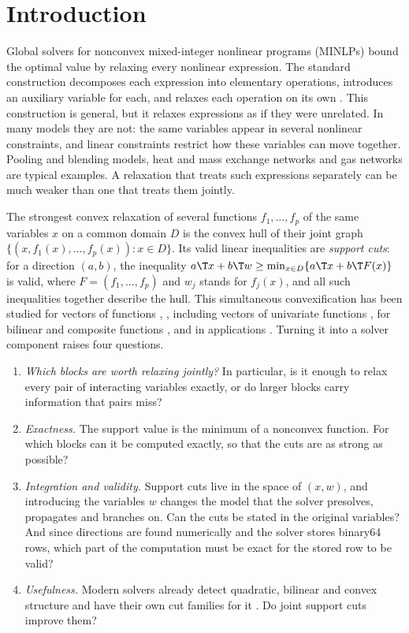 \section{Introduction}\label{sec:introduction}

Global solvers for nonconvex mixed-integer nonlinear programs (MINLPs) bound
the optimal value by relaxing every nonlinear expression. The standard
construction decomposes each expression into elementary operations,
introduces an auxiliary variable for each, and relaxes each operation on its
own \citep{McCormick1976,SmithPantelides1999,TawarmalaniSahinidis2004}. This
construction is general, but it relaxes expressions as if they were
unrelated. In many models they are not: the same variables appear in several
nonlinear constraints, and linear constraints restrict how these variables
can move together. Pooling and blending models, heat and mass exchange
networks and gas networks are typical examples. A relaxation that treats such
expressions separately can be much weaker than one that treats them jointly.

The strongest convex relaxation of several functions $f_1,\dots,f_p$ of the
same variables $x$ on a common domain $D$ is the convex hull of their joint
graph $\{(x,f_1(x),\dots,f_p(x)):x\in D\}$. Its valid linear inequalities are
\emph{support cuts}: for a direction $(a,b)$, the inequality
$a\T x+b\T w\ge\min_{x\in D}\{a\T x+b\T F(x)\}$ is valid, where
$F=(f_1,\dots,f_p)$ and $w_j$ stands for $f_j(x)$, and all such inequalities together describe the hull. This
simultaneous convexification has been studied for vectors of functions
\citep{Tawarmalani2010}, \citep[Proposition~1]{LiersEtAl2021}, including
vectors of univariate functions \citep{HeLiuTawarmalani2025}, for bilinear and
composite functions
\citep{DavarniaRichardTawarmalani2017,HeTawarmalani2021,ZhuHeTawarmalani2026},
and in applications \citep{LiersEtAl2021}.
Turning it into a solver component raises four questions.
\begin{enumerate}[label=(\arabic*)]
\item \emph{Which blocks are worth relaxing jointly?} In particular, is it
enough to relax every pair of interacting variables exactly, or do larger
blocks carry information that pairs miss?
\item \emph{Exactness.} The support value is the minimum of a nonconvex
function. For which blocks can it be computed exactly, so that the cuts are
as strong as possible?
\item \emph{Integration and validity.} Support cuts live in the space of
$(x,w)$, and introducing the variables $w$ changes the model that the solver
presolves, propagates and branches on. Can the cuts be stated in the original
variables? And since directions are found numerically and the solver stores
binary64 rows, which part of the computation must be exact for the stored row
to be valid?
\item \emph{Usefulness.} Modern solvers already detect quadratic, bilinear and
convex structure and have their own cut families for it
\citep{BestuzhevaEtAl2025}. Do joint support cuts improve them?
\end{enumerate}

